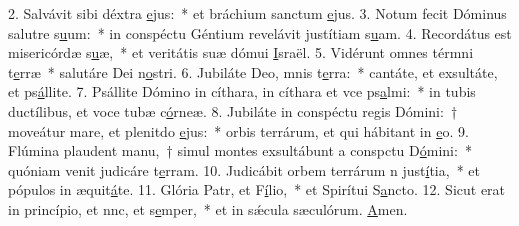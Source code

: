 2. Salvávit sibi déxtra \uline{e}jus:~* et bráchium sanctum \uline{e}jus.
3. Notum fecit Dóminus salutre s\uline{u}um:~* in conspéctu Géntium revelávit justítiam s\uline{u}am.
4. Recordátus est misericórdæ s\uline{u}æ,~* et veritátis suæ dómui \uline{I}sraël.
5. Vidérunt omnes térmni t\uline{e}rræ~* salutáre Dei n\uline{o}stri.
6. Jubiláte Deo, mnis t\uline{e}rra:~* cantáte, et exsultáte, et ps\uline{á}llite.
7. Psállite Dómino in cíthara, in cíthara et vce ps\uline{a}lmi:~* in tubis ductílibus, et voce tubæ c\uline{ó}rneæ.
8. Jubiláte in conspéctu regis Dómini:~† moveátur mare, et plenitdo \uline{e}jus:~* orbis terrárum, et qui hábitant in \uline{e}o.
9. Flúmina plaudent manu,~† simul montes exsultábunt a conspctu D\uline{ó}mini:~* quóniam venit judicáre t\uline{e}rram.
10. Judicábit orbem terrárum n just\uline{í}tia,~* et pópulos in æquit\uline{á}te.
11. Glória Patr, et F\uline{í}lio,~* et Spirítui S\uline{a}ncto.
12. Sicut erat in princípio, et nnc, et s\uline{e}mper,~* et in sǽcula sæculórum. \uline{A}men.
